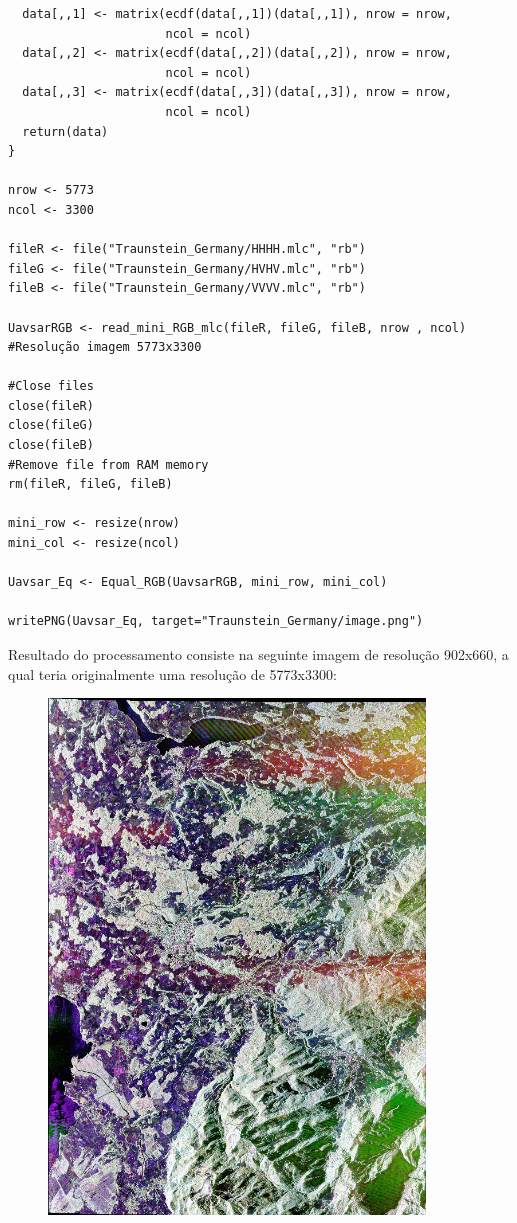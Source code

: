 \documentclass[12pt]{article}
\begin{document}
\begin{verbatim}
  data[,,1] <- matrix(ecdf(data[,,1])(data[,,1]), nrow = nrow,
                      ncol = ncol)
  data[,,2] <- matrix(ecdf(data[,,2])(data[,,2]), nrow = nrow,
                      ncol = ncol)
  data[,,3] <- matrix(ecdf(data[,,3])(data[,,3]), nrow = nrow,
                      ncol = ncol)  
  return(data)
}

nrow <- 5773
ncol <- 3300

fileR <- file("Traunstein_Germany/HHHH.mlc", "rb")
fileG <- file("Traunstein_Germany/HVHV.mlc", "rb")
fileB <- file("Traunstein_Germany/VVVV.mlc", "rb")

UavsarRGB <- read_mini_RGB_mlc(fileR, fileG, fileB, nrow , ncol) #Resolução imagem 5773x3300

#Close files
close(fileR)
close(fileG)
close(fileB)
#Remove file from RAM memory
rm(fileR, fileG, fileB)

mini_row <- resize(nrow)
mini_col <- resize(ncol)

Uavsar_Eq <- Equal_RGB(UavsarRGB, mini_row, mini_col)

writePNG(Uavsar_Eq, target="Traunstein_Germany/image.png")

\end{verbatim}

Resultado do processamento consiste na seguinte imagem de resolução 902x660, a qual teria originalmente uma resolução de 5773x3300:

\begin{figure}[!ht]
	\begin{center}
		\includegraphics[width = 100mm, scale = 0.5]{image}
	\end{center}
\end{figure}
\end{document}

